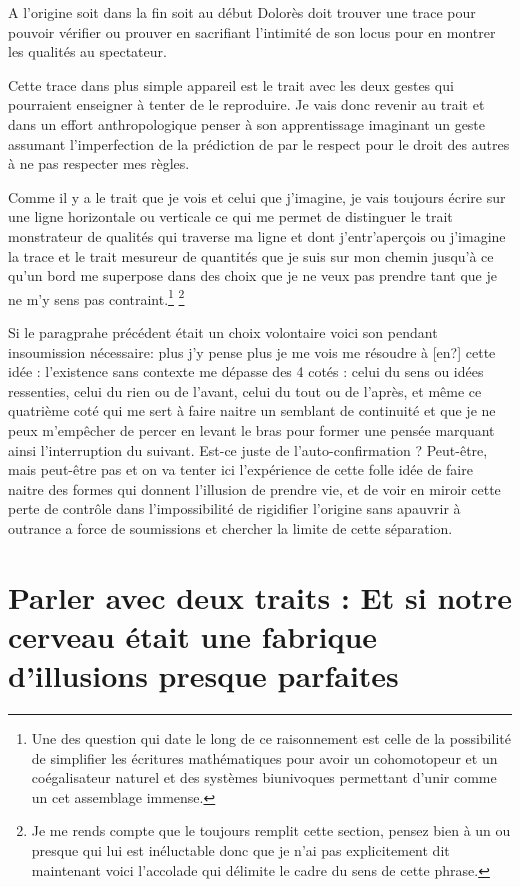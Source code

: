 \documentclass{article}
\begin{document}
A l'origine  soit dans la fin soit au début Dolorès  doit trouver une trace pour pouvoir vérifier ou prouver en sacrifiant l'intimité de son locus pour en montrer les qualités au spectateur.

Cette trace dans plus simple appareil est le trait avec les deux gestes qui pourraient enseigner à tenter de le reproduire. Je vais donc revenir au trait et  dans un effort anthropologique penser à son apprentissage imaginant un geste assumant l'imperfection de la prédiction de par le respect pour le droit des autres à ne pas respecter mes règles.

Comme il y a le trait que je vois et celui que j'imagine, je vais toujours écrire sur une ligne horizontale ou verticale  ce qui me  permet de distinguer le trait monstrateur  de qualités qui traverse ma ligne et dont j'entr'aperçois ou j'imagine la trace  et le trait mesureur de quantités que je suis sur mon chemin jusqu'à ce qu'un bord me superpose dans des choix que je ne veux pas prendre tant que je ne m'y sens pas contraint.\footnote{Une des question qui date le long de ce raisonnement est celle de la possibilité de simplifier les écritures mathématiques pour avoir un cohomotopeur et un coégalisateur naturel  et des systèmes biunivoques permettant d'unir comme un cet assemblage immense.} \footnote{Je me rends compte que le toujours remplit cette section, pensez bien à un ou presque qui lui est inéluctable donc que je n'ai pas explicitement dit maintenant voici l'accolade qui délimite le cadre du sens de cette phrase.} 


Si le paragprahe précédent était un choix volontaire voici son pendant insoumission nécessaire: plus j'y pense plus je me vois me résoudre à [en?] cette idée :  l'existence sans contexte me dépasse des 4 cotés : celui du sens ou idées ressenties, celui du rien  ou de l'avant,  celui du tout ou de l'après, et même ce quatrième coté qui me sert à faire naitre un semblant de continuité et que je ne peux m'empêcher de percer en levant le bras pour former une pensée marquant ainsi l'interruption du suivant. Est-ce juste de l'auto-confirmation ? Peut-être, mais peut-être pas et on va tenter ici l'expérience de cette folle idée de faire naitre des formes qui donnent l'illusion de prendre vie, et de voir en miroir  cette perte de contrôle dans l'impossibilité de rigidifier l'origine sans apauvrir à outrance a force de soumissions et chercher la limite de cette séparation.   

\section{Parler avec deux traits : Et si notre cerveau était une fabrique d'illusions presque parfaites }
\end{document}
